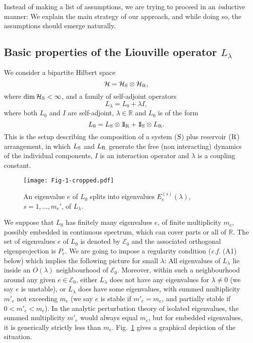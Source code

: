 \documentclass[letterpaper,onecolumn,11pt,accepted=2021-12-09]{quantumarticle}
\numberwithin{equation}{section}
\renewcommand{\r}{{\rm R}}
\newcommand{\s}{{\rm S}}
\newcommand{\bbbone}{\mathchoice {\rm 1\mskip-4mu l} {\rm 1\mskip-4mu l}
	{\rm 1\mskip-4.5mu l} {\rm 1\mskip-5mu l}}
\begin{document}
Instead of making a list of assumptions, we are trying to proceed in an {\em in}ductive manner: We explain the main strategy of our approach, and while doing so, the assumptions should emerge naturally. 





\subsection{Basic properties of the Liouville operator $L_\lambda$}

We consider a  bipartite Hilbert space
\begin{equation}
	{\mathcal H}={\mathcal H}_\s\otimes{\mathcal H}_\r,
	\label{H}
\end{equation} 
where $\dim{\mathcal H}_\s<\infty$, and a family of self-adjoint operators 
\begin{equation}
\label{m1}
L_\lambda = L_0 +\lambda I,
\end{equation}
where both $L_0$ and $I$ are self-adjoint, $\lambda\in\mathbb R$ and $L_0$ is of the form
\begin{equation}
L_0 = L_\s\otimes\bbbone_\r + \bbbone_\s\otimes L_\r.
\label{3}
\end{equation}
This is the setup describing  the composition of a system ($\s$)  plus reservoir ($\r$) arrangement, in which $L_\s$ and $L_\r$ generate the free (non interacting) dynamics of the individual components, $I$ is an interaction operator and $\lambda$ is a coupling constant. 



\begin{figure}[b]
	\centering
	\texttt{[image: Fig-1-cropped.pdf]}
	\caption{An eigenvalue $e$ of $L_0$ splits into eigenvalues $E_e^{(s)}\!(\lambda)$, $s=1,\ldots,m_e'$, of $L_\lambda$.}
	\label{Fig1}
\end{figure}


We suppose that $L_0$ has finitely many eigenvalues $e$, of finite multiplicity $m_e$, possibly embedded in continuous spectrum, which can cover parts or all of $\mathbb R$. The set of eigenvalues $e$ of $L_0$ is denoted by ${\mathcal E}_0$ and the associated orthogonal eigenprojection is $P_e$. We are going to impose a regularity condition ({\em c.f.} (A1) below) which implies the following picture for small $\lambda$: All eigenvalues of $L_\lambda$  lie inside an $O(\lambda)$ neighbourhood of ${\mathcal E}_0$. Moreover, within such a neighbourhood around any given $e\in{\mathcal E}_0$, either $L_\lambda$ does not have any eigenvalues for $\lambda\neq 0$ (we say $e$ is unstable), or $L_\lambda$ does have some eigenvalues, with summed multiplicity $m'_e$ not exceeding $m_e$ (we say $e$ is stable if $m'_e=m_e$, and  partially stable if $0<m'_e<m_e$). In the analytic perturbation theory of isolated eigenvalues, the summed multiplicity $m'_e$ would always equal $m_e$, but for embedded eigenvalues, it is generically strictly less than $m_e$.  Fig.~\ref{Fig1} gives a graphical depiction of the situation. 
\bigskip
\end{document}

